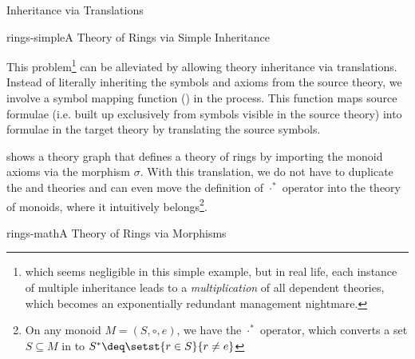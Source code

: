 \begin{omgroup}[id=complex-theories,short=Complex Theories,
                            creators=miko,contributors=frabe]
\begin{omgroup}[id=morphisms]{Inheritance via Translations}
\begin{module}[id=morphisms]
\begin{myfig}{rings-simple}{A Theory of Rings via Simple Inheritance}
\end{myfig}
  
\begin{omtext}
  This problem\footnote{which seems negligible in this simple example, but in real life,
    each instance of multiple inheritance leads to a {\emph{multiplication}} of all
    dependent theories, which becomes an exponentially redundant management nightmare.}
  can be alleviated by allowing theory inheritance via translations.  Instead of literally
  inheriting the symbols and axioms from the source theory, we involve a symbol mapping
  function () in the process. This function
  maps source formulae (i.e. built up exclusively from symbols visible in the source
  theory) into formulae in the target theory by translating the source symbols.
\end{omtext}

\begin{omtext}
{} shows a theory graph that defines a theory of rings by importing
the monoid axioms via the morphism $\sigma$. With this translation, we do not have to
duplicate the {} and {} theories and can even move the
definition of $\cdot^*$ operator into the theory of monoids, where it intuitively
belongs\footnote{On any monoid $M=(S,\circ,e)$, we have the $\cdot^*$ operator, which
  converts a set $S\subseteq M$ in to $S^*\deq\setst{r\in S}{r\ne e}$}.
\end{omtext}

\begin{myfig}{rings-math}{A Theory of Rings via Morphisms}
\end{myfig}
\end{module}
\end{omgroup}
\end{omgroup}
